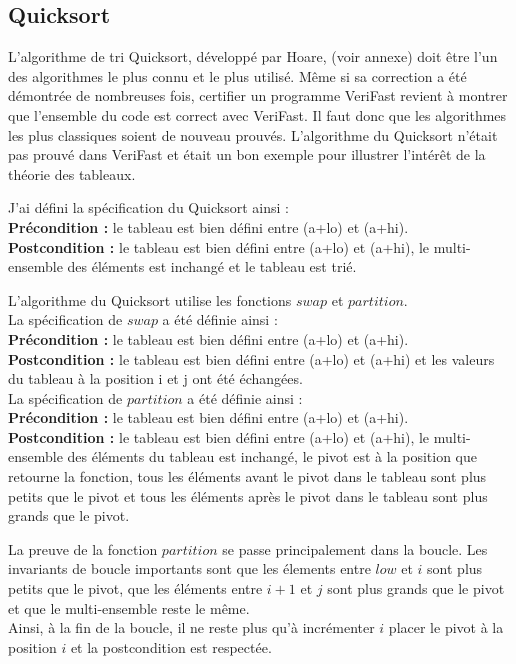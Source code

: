 \documentclass[11pt,openany]{article}
\newcommand{\verifast}{VeriFast}
\begin{document}
	\subsection{Quicksort}
		L'algorithme de tri Quicksort, d\'evelopp\'e par Hoare, (voir annexe) doit \^etre l'un des algorithmes le plus connu et le plus utilis\'e. M\^eme si sa correction a \'et\'e d\'emontr\'ee de nombreuses fois, certifier un programme \verifast{} revient \`a montrer que l'ensemble du code est correct avec \verifast. Il faut donc que les algorithmes les plus classiques soient de nouveau prouv\'es. L'algorithme du Quicksort n'\'etait pas prouv\'e dans \verifast{} et \'etait un bon exemple pour illustrer l'int\'er\^et de la th\'eorie des tableaux. 
		
		J'ai d\'efini la sp\'ecification du Quicksort ainsi :\\
		\textbf{Pr\'econdition :} le tableau est bien d\'efini entre (a+lo) et (a+hi).\\
		\textbf{Postcondition :} le tableau est bien d\'efini entre (a+lo) et (a+hi), le multi-ensemble des \'el\'ements est inchang\'e et le tableau est tri\'e.
		
		L'algorithme du Quicksort utilise les fonctions $swap$ et $partition$.\\ La sp\'ecification de $swap$ a \'et\'e d\'efinie ainsi :\\
		\textbf{Pr\'econdition :} le tableau est bien d\'efini entre (a+lo) et (a+hi).\\
		\textbf{Postcondition :} le tableau est bien d\'efini entre (a+lo) et (a+hi) et les valeurs du tableau \`a la position i et j ont \'et\'e \'echang\'ees. \\
La sp\'ecification de $partition$ a \'et\'e d\'efinie ainsi :\\
		\textbf{Pr\'econdition :} le tableau est bien d\'efini entre (a+lo) et (a+hi).\\
		\textbf{Postcondition :} le tableau est bien d\'efini entre (a+lo) et (a+hi), le multi-ensemble des \'el\'ements du tableau est inchang\'e, le pivot est \`a la position que retourne la fonction, tous les \'el\'ements avant le pivot dans le tableau sont plus petits que le pivot et tous les \'el\'ements apr\`es le pivot dans le tableau sont plus grands que le pivot.
		
		La preuve de la fonction $partition$ se passe principalement dans la boucle. Les invariants de boucle importants sont que les \'elements entre $low$ et $i$ sont plus petits que le pivot, que les \'el\'ements entre $i+1$ et $j$ sont plus grands que le pivot et que le multi-ensemble reste le m\^eme.\\
		Ainsi, \`a la fin de la boucle, il ne reste plus qu'\`a incr\'ementer $i$ placer le pivot \`a la position $i$ et la postcondition est respect\'ee.
		
\end{document}
